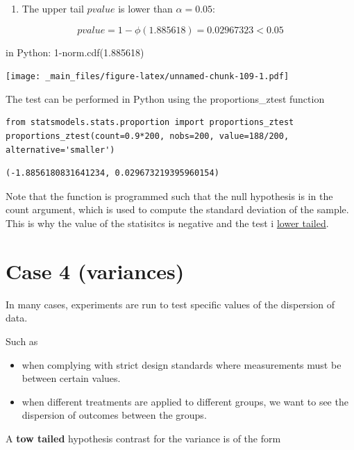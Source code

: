 \documentclass[
]{book}
\providecommand{\tightlist}{%
  \setlength{\itemsep}{0pt}\setlength{\parskip}{0pt}}
\begin{document}
\begin{enumerate}
\def\labelenumi{\arabic{enumi}.}
\setcounter{enumi}{2}
\tightlist
\item
  The upper tail \(pvalue\) is lower than \(\alpha=0.05\):
\end{enumerate}

\[pvalue=1-\phi(1.885618)=0.02967323<0.05\]

in Python: 1-norm.cdf(1.885618)

\texttt{[image: \_main\_files/figure-latex/unnamed-chunk-109-1.pdf]}

The test can be performed in Python using the proportions\_ztest function

\begin{verbatim}
from statsmodels.stats.proportion import proportions_ztest
proportions_ztest(count=0.9*200, nobs=200, value=188/200, alternative='smaller')
\end{verbatim}

\begin{verbatim}
(-1.8856180831641234, 0.029673219395960154)
\end{verbatim}

Note that the function is programmed such that the null hypothesis is in the count argument, which is used to compute the standard deviation of the sample. This is why the value of the statisitcs is negative and the test i \href{https://www.geeksforgeeks.org/how-to-perform-a-one-proportion-z-test-in-python/}{lower tailed}.

\hypertarget{case-4-variances}{%
\section{Case 4 (variances)}\label{case-4-variances}}

In many cases, experiments are run to test specific values of the dispersion of data.

Such as

\begin{itemize}
\item
  when complying with strict design standards where measurements must be between certain values.
\item
  when different treatments are applied to different groups, we want to see the dispersion of outcomes between the groups.
\end{itemize}

A \textbf{tow tailed} hypothesis contrast for the variance is of the form
\end{document}
